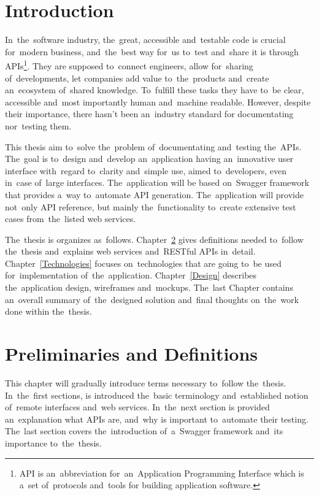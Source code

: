 

\chapter{Introduction}
In~the~software industry, the~great, accessible and~testable code is crucial
for~modern business, and~the~best way for~us to~test and~share it is
through APIs\footnote{API is an~abbreviation for~an~Application Programming
Interface which is a~set of~protocols and~tools for building application
software.}. They are supposed to~connect engineers, allow for~sharing
of~developments, let companies add value to~the~products and~create an~ecosystem
of~shared knowledge. To~fulfill these tasks they have to~be clear, accessible
and~most importantly human and~machine readable. However, despite their
importance, there hasn't been an~industry standard for documentating nor~testing
them.

This thesis aim to~solve the~problem of~documentating and~testing the~APIs.
The~goal is to~design and~develop an~application having an~innovative user
interface with~regard to~clarity and~simple use, aimed to~developers, even
in~case of~large interfaces. The~application will be based on~Swagger
framework that provides a~way to~automate API generation.
The~application will provide not~only API reference, but mainly
the~functionality to~create extensive test cases from~the~listed web services.


The~thesis is organizes as~follows. Chapter~\ref{Preliminaries} gives
definitions needed to~follow the~thesis and~explains web services
and~RESTful APIs in~detail. Chapter~\ref{Technologies} focuses on~technologies
that are going to~be used for~implementation of~the~application. Chapter~\ref{Design}
describes the~application design, wireframes and~mockups.
The~last Chapter contains an~overall summary of~the~designed solution and~final
thoughts on~the~work done within the~thesis.




\chapter{Preliminaries and Definitions}
\label{Preliminaries}
This chapter will gradually introduce terms necessary to~follow the~thesis.
In~the~first sections, is introduced the~basic terminology and~established
notion of~remote interfaces and~web services. In~the~next section is
provided an~explanation what APIs are, and~why is important to~automate
their testing. The~last section covers the~introduction of~a~Swagger framework \cite{Swagger} 
and~its importance to~the~thesis.

